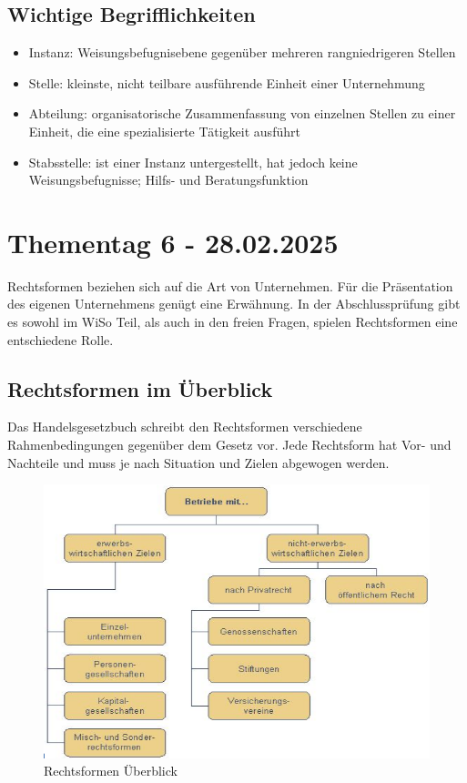 \documentclass[]{article}
\begin{document}
\subsection{Wichtige Begrifflichkeiten}
\begin{itemize}
	\item Instanz: Weisungsbefugnisebene gegenüber mehreren rangniedrigeren Stellen
	\item Stelle: kleinste, nicht teilbare ausführende Einheit einer Unternehmung 
	\item Abteilung: organisatorische Zusammenfassung von einzelnen Stellen zu einer Einheit, die eine spezialisierte Tätigkeit ausführt
	\item Stabsstelle: ist einer Instanz untergestellt, hat jedoch keine Weisungsbefugnisse; Hilfs- und Beratungsfunktion
\end{itemize}

\newpage
\section{Thementag 6 - 28.02.2025}
Rechtsformen beziehen sich auf die Art von Unternehmen. Für die Präsentation des eigenen Unternehmens genügt eine Erwähnung. In der Abschlussprüfung gibt es sowohl im WiSo Teil, als auch in den freien Fragen, spielen Rechtsformen eine entschiedene Rolle.

\subsection{Rechtsformen im Überblick}

Das Handelsgesetzbuch schreibt den Rechtsformen verschiedene Rahmenbedingungen gegenüber dem Gesetz vor. Jede Rechtsform hat Vor- und Nachteile und muss je nach Situation und Zielen abgewogen werden.

\begin{figure}[h!]
	\centering
	\includegraphics[width=0.7\linewidth]{"assetes/Rechtsform"}
	\caption{Rechtsformen Überblick}
	\label{fig:rechtsformen---rechtsformenüberblick}
\end{figure}
\end{document}
